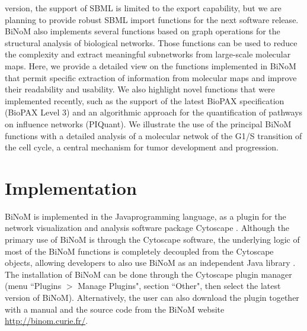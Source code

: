 \documentclass[10pt]{bmc_article}
\newenvironment{bmcformat}{\baselineskip20pt\sloppy\setboolean{publ}{false}}{\baselineskip20pt\sloppy}
\begin{document}
\begin{bmcformat}
version, the support of SBML is limited to the export capability, but we are
planning to provide robust SBML import functions for the next software release. 
BiNoM also implements several functions based on graph operations for the structural analysis of
biological networks. Those functions can be used to reduce the complexity and
extract meaningful subnetworks from large-scale molecular maps. Here, we provide
a detailed view on the functions implemented in BiNoM
that permit specific extraction of information from molecular maps
and improve their readability and usability. We also highlight novel functions
that were implemented recently, such as the support of the latest BioPAX
specification (BioPAX Level 3) and an algorithmic approach for the
quantification of pathways on influence networks (PIQuant). We illustrate the
use of the principal BiNoM functions with a detailed analysis of a molecular
netwok of the G1/S transition of the cell cycle, a central mechanism
for tumor development and progression.

\section*{Implementation}
BiNoM is implemented in the Java\texttrademark programming language, as a plugin
for the network visualization and analysis software package Cytoscape
\cite{cline2007integration}. Although the primary use of BiNoM is through the
Cytoscape software, the underlying logic of most of the BiNoM functions is completely
decoupled from the Cytoscape objects, allowing developers to also use BiNoM as
an independent Java library \cite{zinovyev2008binom}. The installation of BiNoM
can be done through the Cytoscape plugin manager (menu ``Plugins $>$ Manage
Plugins", section ``Other", then select the latest version of BiNoM). Alternatively, the user can
also download the plugin together with a manual and the source code from the
BiNoM website \url{http://binom.curie.fr/}. 


\end{bmcformat}
\end{document}
